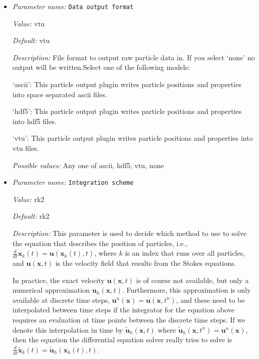 \begin{itemize}
\item {\it Parameter name:} {\tt Data output format}
\label{parameters:Postprocess/Particles/Data output format}


{\it Value:} vtu


{\it Default:} vtu


{\it Description:} File format to output raw particle data in. If you select `none' no output will be written.Select one of the following models:

`ascii': This particle output plugin writes particle positions and properties into space separated ascii files.

`hdf5': This particle output plugin writes particle positions and properties into hdf5 files.

`vtu': This particle output plugin writes particle positions and properties into vtu files.


{\it Possible values:} Any one of ascii, hdf5, vtu, none
\item {\it Parameter name:} {\tt Integration scheme}
\label{parameters:Postprocess/Particles/Integration scheme}


{\it Value:} rk2


{\it Default:} rk2


{\it Description:} This parameter is used to decide which method to use to solve the equation that describes the position of particles, i.e., $\frac{d}{dt}\mathbf x_k(t) = \mathbf u(\mathbf x_k(t),t)$, where $k$ is an index that runs over all particles, and $\mathbf u(\mathbf x,t)$ is the velocity field that results from the Stokes equations.

In practice, the exact velocity $\mathbf u(\mathbf x,t)$ is of course not available, but only a numerical approximation $\mathbf u_h(\mathbf x,t)$. Furthermore, this approximation is only available at discrete time steps, $\mathbf u^n(\mathbf x)=\mathbf u(\mathbf x,t^n)$, and these need to be interpolated between time steps if the integrator for the equation above requires an evaluation at time points between the discrete time steps. If we denote this interpolation in time by $\tilde{\mathbf u}_h(\mathbf x,t)$ where $\tilde{\mathbf u}_h(\mathbf x,t^n)=\mathbf u^n(\mathbf x)$, then the equation the differential equation solver really tries to solve is $\frac{d}{dt}\tilde{\mathbf x}_k(t) =  \tilde{\mathbf u}_h(\mathbf x_k(t),t)$.


\end{itemize}
